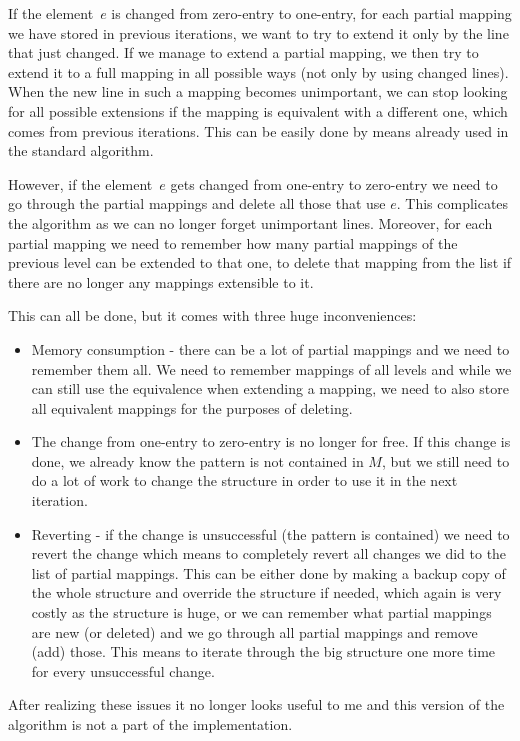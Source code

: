 If the element~$e$ is changed from zero-entry to one-entry, for each partial mapping we have stored in previous iterations, we want to try to extend it only by the line that just changed. If we manage to extend a partial mapping, we then try to extend it to a full mapping in all possible ways (not only by using changed lines). When the new line in such a mapping becomes unimportant, we can stop looking for all possible extensions if the mapping is equivalent with a different one, which comes from previous iterations. This can be easily done by means already used in the standard algorithm.

However, if the element~$e$ gets changed from one-entry to zero-entry we need to go through the partial mappings and delete all those that use $e$. This complicates the algorithm as we can no longer forget unimportant lines. Moreover, for each partial mapping we need to remember how many partial mappings of the previous level can be extended to that one, to delete that mapping from the list if there are no longer any mappings extensible to it.

This can all be done, but it comes with three huge inconveniences:
\begin{itemize}
\item Memory consumption - there can be a lot of partial mappings and we need to remember them all. We need to remember mappings of all levels and while we can still use the equivalence when extending a mapping, we need to also store all equivalent mappings for the purposes of deleting.
\item The change from one-entry to zero-entry is no longer for free. If this change is done, we already know the pattern is not contained in $M$, but we still need to do a lot of work to change the structure in order to use it in the next iteration.
\item Reverting - if the change is unsuccessful (the pattern is contained) we need to revert the change which means to completely revert all changes we did to the list of partial mappings. This can be either done by making a backup copy of the whole structure and override the structure if needed, which again is very costly as the structure is huge, or we can remember what partial mappings are new (or deleted) and we go through all partial mappings and remove (add) those. This means to iterate through the big structure one more time for every unsuccessful change.
\end{itemize}
After realizing these issues it no longer looks useful to me and this version of the algorithm is not a part of the implementation.

